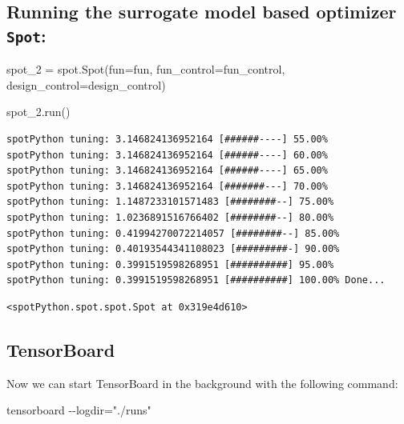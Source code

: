 \documentclass[
  letterpaper,
  DIV=11,
  numbers=noendperiod]{scrreprt}
\newenvironment{Shaded}{\begin{snugshade}}{\end{snugshade}}
\newcommand{\NormalTok}[1]{\textcolor[rgb]{0.00,0.23,0.31}{#1}}
\newcommand{\OperatorTok}[1]{\textcolor[rgb]{0.37,0.37,0.37}{#1}}
\begin{document}
\subsection{\texorpdfstring{Running the surrogate model based optimizer
\texttt{Spot}:}{Running the surrogate model based optimizer Spot:}}\label{running-the-surrogate-model-based-optimizer-spot}

\begin{Shaded}
\begin{Highlighting}[]
\NormalTok{spot\_2 }\OperatorTok{=}\NormalTok{ spot.Spot(fun}\OperatorTok{=}\NormalTok{fun,}
\NormalTok{                   fun\_control}\OperatorTok{=}\NormalTok{fun\_control,}
\NormalTok{                   design\_control}\OperatorTok{=}\NormalTok{design\_control)}
\end{Highlighting}
\end{Shaded}

\begin{Shaded}
\begin{Highlighting}[]
\NormalTok{spot\_2.run()}
\end{Highlighting}
\end{Shaded}

\begin{verbatim}
spotPython tuning: 3.146824136952164 [######----] 55.00% 
spotPython tuning: 3.146824136952164 [######----] 60.00% 
spotPython tuning: 3.146824136952164 [######----] 65.00% 
spotPython tuning: 3.146824136952164 [#######---] 70.00% 
spotPython tuning: 1.1487233101571483 [########--] 75.00% 
spotPython tuning: 1.0236891516766402 [########--] 80.00% 
spotPython tuning: 0.41994270072214057 [########--] 85.00% 
spotPython tuning: 0.40193544341108023 [#########-] 90.00% 
spotPython tuning: 0.3991519598268951 [##########] 95.00% 
spotPython tuning: 0.3991519598268951 [##########] 100.00% Done...
\end{verbatim}

\begin{verbatim}
<spotPython.spot.spot.Spot at 0x319e4d610>
\end{verbatim}

\subsection{TensorBoard}\label{tensorboard-5}

Now we can start TensorBoard in the background with the following
command:

\begin{Shaded}
\begin{Highlighting}[]
\NormalTok{tensorboard {-}{-}logdir="./runs"}
\end{Highlighting}
\end{Shaded}
\end{document}
